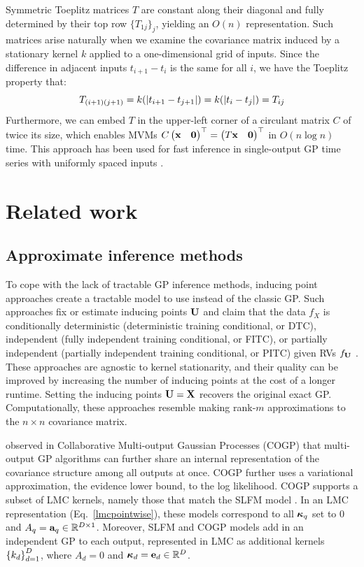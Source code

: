 \documentclass{article}
\begin{document}
Symmetric Toeplitz matrices $T$ are constant along their diagonal and fully determined by their top row $\{T_{1j}\}_j$, yielding an $O(n)$ representation. Such matrices arise naturally when we examine the covariance matrix induced by a stationary kernel $k$ applied to a one-dimensional grid of inputs. Since the difference in adjacent inputs $t_{i+1}-t_{i}$ is the same for all $i$, we have the Toeplitz property that:
\[
T_{(i+1)(j+1)}=k(\left|t_{i+1} -t_{j+1}\right|)=k(\left|t_i-t_j\right|)=T_{ij}
\]
Furthermore, we can embed $T$ in the upper-left corner of a circulant matrix $C$ of twice its size, which enables MVMs $C\begin{pmatrix} \textbf{x} & \textbf{0} \end{pmatrix}^\top=\begin{pmatrix} T\textbf{x} &\textbf{0} \end{pmatrix}^\top$ in $O(n\log n)$ time. This approach has been used for fast inference in single-output GP time series with uniformly spaced inputs \cite{cunningham2008fast}.

\section{Related work}
\label{sec:related-work}
\subsection{Approximate inference methods}

To cope with the lack of tractable GP inference methods, inducing point approaches create a tractable model to use instead of the classic GP. Such approaches fix or estimate inducing points $\textbf{U}$ and claim that the data $f_X$ is conditionally deterministic (deterministic training conditional, or DTC), independent (fully independent training conditional, or FITC), or partially independent (partially independent training conditional, or PITC) given RVs $f_{\textbf{U}}$  \cite{quinonero2005unifying}. These approaches are agnostic to kernel stationarity, and their quality can be improved by increasing the number of inducing points at the cost of a longer runtime. Setting the inducing points $\textbf{U}=\textbf{X}$ recovers the original exact GP. Computationally, these approaches resemble making rank-$m$ approximations to the $n\times n$ covariance matrix.

\citet{nguyen2014collaborative} observed in Collaborative Multi-output Gaussian Processes (COGP) that multi-output GP algorithms can further share an internal representation of the covariance structure among all outputs at once. COGP further uses a variational approximation, the evidence lower bound, to the log likelihood. COGP supports a subset of LMC kernels, namely those that match the SLFM model \cite{seeger2005semiparametric}. In an LMC representation (Eq.~\ref{lmcpointwise}), these models correspond to all ${\boldsymbol\kappa}_q$ set to 0 and $A_q=\textbf{a}_q\in\mathbb{R}^{D\times 1}$. Moreover, SLFM and COGP models add in an independent GP to each output, represented in LMC as additional kernels $\left\{ k_d \right\}_{ d=1 }^{ D }$, where $A_d=0$ and ${\boldsymbol\kappa}_d=\textbf{e}_d\in\mathbb{R}^D$.
\end{document}
